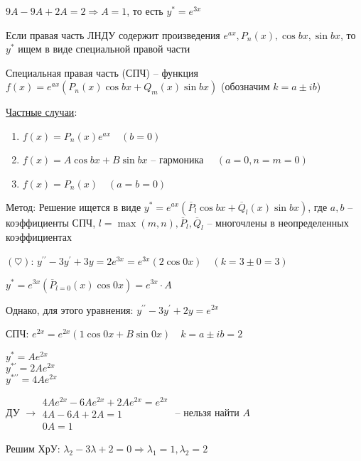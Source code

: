 \documentclass[12pt]{article}
\begin{document}
    $9A - 9A + 2A = 2 \Longrightarrow A = 1$, то есть $y^* = e^{3x}$

    \Nota Если правая часть ЛНДУ содержит произведения $e^{ax}, P_n(x), \cos bx, \sin bx$, то $y^*$ ищем в виде специальной правой части

    \Def Специальная правая часть (СПЧ) -- функция $f(x) = e^{ax} (P_n(x)\cos bx + Q_m (x)\sin bx)$ (обозначим $k = a \pm ib$)

    \underline{Частные случаи}:

    \begin{enumerate}
        \item $f(x) = P_n(x) e^{ax} \quad (b = 0)$

        \item $f(x) = A\cos b x + B \sin bx$ -- гармоника $\quad (a = 0, n = m = 0)$

        \item $f(x) = P_n(x) \quad (a = b = 0)$
    \end{enumerate}

    Метод: Решение ищется в виде $y^* = e^{ax} (\overline{P}_l \cos bx + \overline{Q}_l (x) \sin bx)$,
    где $a, b$ -- коэффициенты СПЧ, $l = \max(m, n), \overline{P}_l, \overline{Q}_l$ -- многочлены в неопределенных коэффициентах

     $(\heartsuit)$: $y^{\prime\prime} - 3y^\prime + 3y = 2e^{3x} = e^{3x} (2 \cos 0x) \quad (k = 3 \pm 0 = 3)$

    $y^* = e^{3x} (\overline{P}_{l = 0} (x) \cos 0x) = e^{3x} \cdot A$

     Однако, для этого уравнения: $y^{\prime\prime} - 3y^\prime + 2y = e^{2x}$

    СПЧ: $e^{2x} = e^{2x} (1 \cos 0x + B \sin 0x) \quad k = a \pm ib = 2$

    \begin{rcases*}
    $y^* = Ae^{2x}$ \\
    $y^{*\prime} = 2Ae^{2x}$ \\
    $y^{*\prime\prime} = 4Ae^{2x}$ \\
    \end{rcases*} ДУ $\longrightarrow \begin{matrix}4Ae^{2x} - 6Ae^{2x} + 2Ae^{2x} = e^{2x} \\ 4A - 6A + 2A = 1 \\ 0A = 1\end{matrix}$ -- нельзя найти $A$ {\Huge 🤯}

    Решим ХрУ: $\lambda_2 - 3\lambda + 2 = 0 \Longrightarrow \lambda_1 = 1, \lambda_2 = 2$
\end{document}
